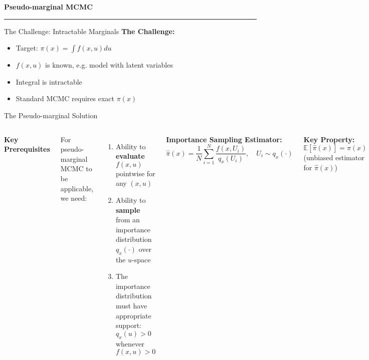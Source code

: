 \begin{frame}
	\vspace{2cm}
	\begin{center}
		{\Huge\textbf{\textcolor{copenhagenred}{Pseudo-marginal MCMC}}}
		\vspace{1cm}

		\rule{4cm}{3pt}
		\vspace{2cm}
	\end{center}
\end{frame}

\begin{frame}{The Challenge: Intractable Marginals}
	\textbf{The Challenge:}
	\begin{itemize}
		\item Target: $\pi(x) = \int f(x,u) du$
		\item $f(x,u)$ is known, e.g. model with latent variables
		\item Integral is \textcolor{copenhagenred}{intractable}
		\item Standard MCMC requires exact $\pi(x)$
	\end{itemize}
\end{frame}

\begin{frame}{The Pseudo-marginal Solution}
	\begin{columns}
		\textbf{Key Prerequisites}

		\vspace{0.15cm}
		For pseudo-marginal MCMC to be applicable, we need:
		\begin{enumerate}
			\item Ability to \textbf{evaluate} $f(x,u)$ pointwise for any $(x,u)$
			\item Ability to \textbf{sample} from an importance distribution $q_x(\cdot)$ over the $u$-space
			\item The importance distribution must have appropriate support: $q_x(u) > 0$ whenever $f(x,u) > 0$
		\end{enumerate}

		\textbf{Importance Sampling Estimator:}
		\begin{equation*}
			\hat{\pi}(x) = \frac{1}{N} \sum_{i=1}^{N} \frac{f(x,U_i)}{q_x(U_i)}, \quad U_i \sim q_x(\cdot)
		\end{equation*}

		\vspace{0.2cm}
		\textbf{Key Property:} $\mathbb{E}[\hat{\pi}(x)] = \pi(x)$ (unbiased estimator for $\hat{\pi}(x)$)

		\vspace{0.2cm}
		\textbf{The Magic:} Replace $\pi$ with $\hat{\pi}$ in MH acceptance ratio!
		\begin{equation*}
			\alpha = \min\left\{1, \frac{\hat{\pi}(y)q(y,x)}{\hat{\pi}(x)q(x,y)}\right\}
		\end{equation*}
		\vspace{0.2cm}
		\textcolor{copenhagenred}{\textbf{Result:}} Still targets correct $\pi(x)$!

	\end{columns}
\end{frame}

